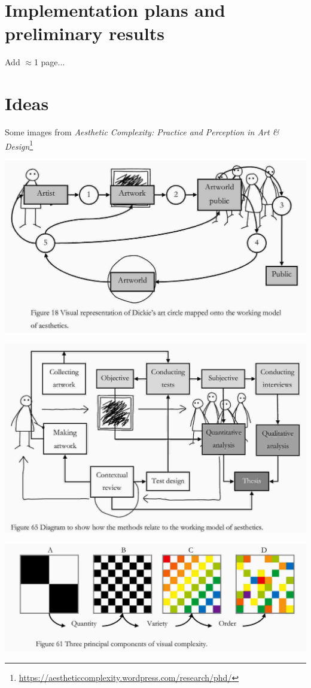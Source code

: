 \section{Implementation plans and preliminary results}\label{sec:implementation}

Add $\approx$1 page...

\section{Ideas}

Some images from \emph{Aesthetic Complexity: Practice and Perception in Art \& Design}\footnote{\url{https://aestheticcomplexity.wordpress.com/research/phd/}}

\includegraphics[width=\columnwidth]{./figures/artworld.jpg}

\includegraphics[width=\columnwidth]{./figures/aesthetic-research.jpg}

\includegraphics[width=\columnwidth]{./figures/quantity-variety-order.jpg}


